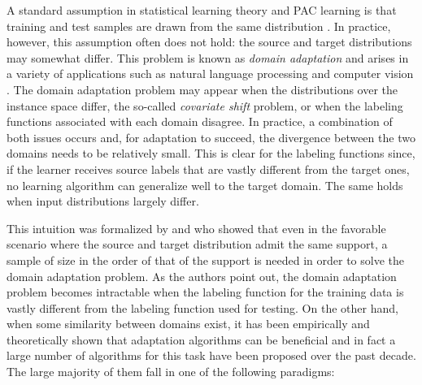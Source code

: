 \documentclass[twoside,11pt]{article}
\newcommand{\ignore}[1]{}
\newcommand{\1}{\mat{1}}
\begin{document}
A standard assumption in statistical learning theory and PAC learning
is that training and test samples are drawn from the same distribution
\citep{Vapnik1998,Valiant1984}. In practice, however, this assumption
often does not hold: the source and target distributions may somewhat
differ. This problem is known as \emph{domain adaptation} and
arises in a variety of applications such as natural language
processing and computer vision
\citep{Dredze07Frustratingly,Blitzer07Biographies,jiang-zhai07,
  LegetterWoodlang,\ignore{Rosenfeld96,}Martinez2002,HoffmanDarrellSaenko2014}. The
domain adaptation problem may appear when the distributions over
the instance space differ, the so-called \emph{covariate shift}
problem, or when the labeling functions associated with each
domain disagree. In practice, a combination of both issues occurs and,
for adaptation to succeed, the divergence between the two domains
needs to be relatively small. This is clear for the labeling functions
since, if the learner receives source labels that are vastly different
from the target ones, no learning algorithm can generalize
well to the target domain. The same holds when input distributions
largely differ.

This intuition was formalized by \cite{shai2010} and
\cite{BenDavidUrner2012} who showed that even in the favorable
scenario where the source and target distribution admit the same
support, a sample of size in the order of that of the support is
needed in order to solve the domain adaptation problem. As the authors
point out, the domain adaptation problem becomes intractable when the
labeling function for the training data is vastly different from the
labeling function used for testing. On the other hand, when some
similarity between domains exist, it has been empirically and
theoretically shown that adaptation algorithms can be
beneficial and in fact a large number of algorithms for this task have
been proposed over the past decade. The large majority of them fall in
one of the following paradigms:
\end{document}
